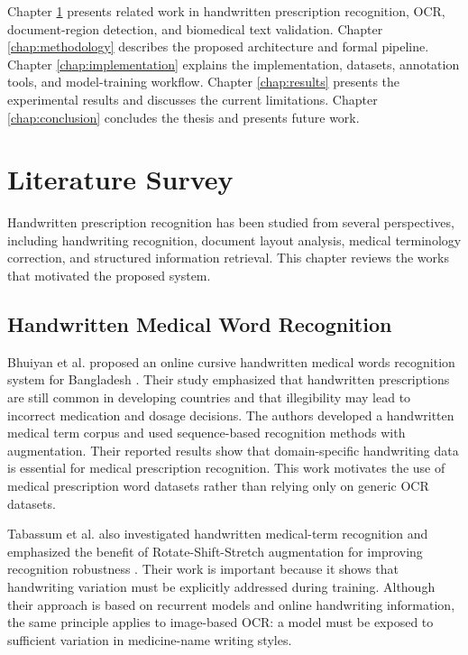 \documentclass[modernstyle,12pt]{thesis}
\begin{document}
Chapter \ref{chap:literature} presents related work in handwritten prescription recognition, OCR, document-region detection, and biomedical text validation. Chapter \ref{chap:methodology} describes the proposed architecture and formal pipeline. Chapter \ref{chap:implementation} explains the implementation, datasets, annotation tools, and model-training workflow. Chapter \ref{chap:results} presents the experimental results and discusses the current limitations. Chapter \ref{chap:conclusion} concludes the thesis and presents future work.

\chapter{Literature Survey}
\label{chap:literature}

Handwritten prescription recognition has been studied from several perspectives, including handwriting recognition, document layout analysis, medical terminology correction, and structured information retrieval. This chapter reviews the works that motivated the proposed system.

\section{Handwritten Medical Word Recognition}

Bhuiyan et al. proposed an online cursive handwritten medical words recognition system for Bangladesh \cite{bhuiyan2022online}. Their study emphasized that handwritten prescriptions are still common in developing countries and that illegibility may lead to incorrect medication and dosage decisions. The authors developed a handwritten medical term corpus and used sequence-based recognition methods with augmentation. Their reported results show that domain-specific handwriting data is essential for medical prescription recognition. This work motivates the use of medical prescription word datasets rather than relying only on generic OCR datasets.

Tabassum et al. also investigated handwritten medical-term recognition and emphasized the benefit of Rotate-Shift-Stretch augmentation for improving recognition robustness \cite{tabassum2022online}. Their work is important because it shows that handwriting variation must be explicitly addressed during training. Although their approach is based on recurrent models and online handwriting information, the same principle applies to image-based OCR: a model must be exposed to sufficient variation in medicine-name writing styles.
\end{document}
